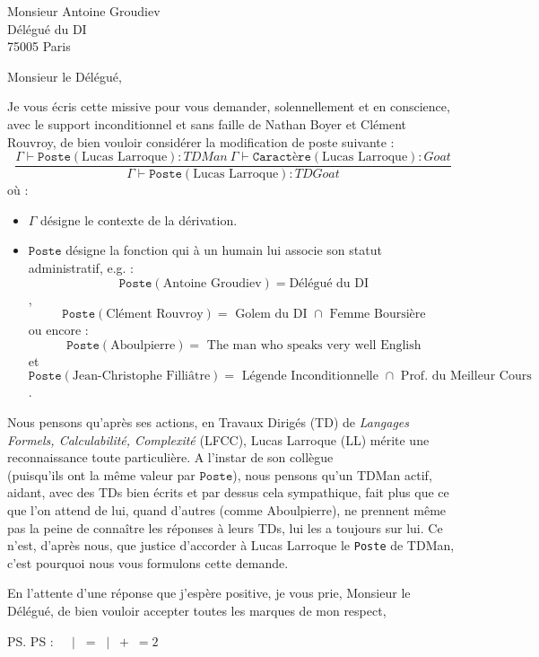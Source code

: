\documentclass[french]{mpbmail}
\begin{document}
    \begin{letter}{%
        Monsieur Antoine Groudiev\\
        Délégué du DI\\
        75005 Paris
        }
        \opening{Monsieur le Délégué,}

        Je vous écris cette missive pour vous demander, solennellement et en conscience, avec le support inconditionnel et sans faille de Nathan Boyer et Clément Rouvroy, de bien vouloir considérer la modification de poste suivante :
        \[
            \frac{\Gamma \vdash \texttt{Poste}(\text{Lucas Larroque}) : TDMan \ \Gamma \vdash \texttt{Caractère}(\text{Lucas Larroque}) : Goat}{\Gamma \vdash \texttt{Poste}(\text{Lucas Larroque}) : TDGoat }    
        \]
        où : 
        \begin{itemize}
            \item $\Gamma$ désigne le contexte de la dérivation.
            \item $\texttt{Poste}$ désigne la fonction qui à un humain lui associe son statut administratif, e.g. : \[\texttt{Poste}(\text{Antoine Groudiev}) = \text{Délégué du DI}\], \[\texttt{Poste}(\text{Clément Rouvroy}) = \text{ Golem du DI } \cap \text{ Femme Boursière}\] ou encore : \[\texttt{Poste}(\text{Aboulpierre}) =\text{ The man who speaks very well English}\] et \[\texttt{Poste}(\text{Jean-Christophe Filliâtre}) = \text{ Légende Inconditionnelle } \cap \text{ Prof. du Meilleur Cours} \].
        \end{itemize}

        Nous pensons qu'après ses actions, en Travaux Dirigés (TD) de \textit{Langages Formels, Calculabilité, Complexité} (LFCC), Lucas Larroque (LL) mérite une reconnaissance toute particulière. A l'instar de son collègue \\ (puisqu'ils ont la même valeur par $\texttt{Poste}$), nous pensons qu'un TDMan actif, aidant, avec des TDs bien écrits et par dessus cela sympathique, fait plus que ce que l'on attend de lui, quand d'autres (comme Aboulpierre), ne prennent même pas la peine de connaître les réponses à leurs TDs, lui les a toujours sur lui.
        Ce n'est, d'après nous, que justice d'accorder à Lucas Larroque le \texttt{Poste} de TDMan, c'est pourquoi nous vous formulons cette demande.

        \closing{En l'attente d'une réponse que j'espère positive, je vous prie, Monsieur le Délégué, de bien vouloir accepter toutes les marques de mon respect,}
        \ps PS : $🧢_{🧢_{🧢_{🧢}}}^{🧢^{🧢^{🧢}}} \mid 🧢 = 🧢 \mid 🧢 + 🧢 = 2 🧢$
    \end{letter}
\end{document}
